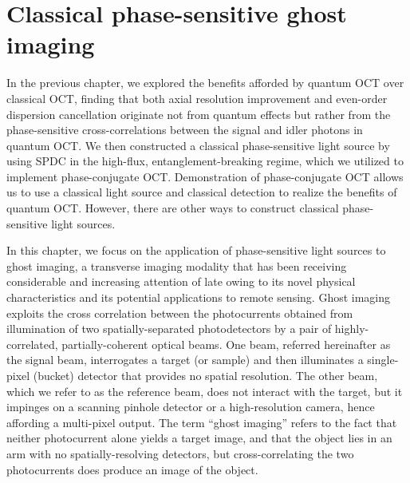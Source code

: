 \chapter{Classical phase-sensitive ghost imaging}
In the previous chapter, we explored the benefits afforded by quantum OCT over classical OCT, finding that both axial resolution improvement and even-order dispersion cancellation originate not from quantum effects but rather from the phase-sensitive cross-correlations between the signal and idler photons in quantum OCT. We then constructed a classical phase-sensitive light source by using SPDC in the high-flux, entanglement-breaking regime, which we utilized to implement phase-conjugate OCT. Demonstration of phase-conjugate OCT allows us to use a classical light source and classical detection to realize the benefits of quantum OCT. However, there are other ways to construct classical phase-sensitive light sources.

In this chapter, we focus on the application of phase-sensitive light sources to ghost imaging, a transverse imaging modality that has been receiving considerable and increasing attention of late owing to its novel physical characteristics and its potential applications to remote sensing. Ghost imaging exploits the cross correlation between the photocurrents obtained from illumination of two spatially-separated photodetectors by a pair of highly-correlated, partially-coherent optical beams. One beam, referred hereinafter as the signal beam, interrogates a target (or sample) and then illuminates a single-pixel (bucket) detector that provides no spatial resolution. The other beam, which we refer to as the reference beam, does not interact with the target, but it impinges on a scanning pinhole detector or a high-resolution camera, hence affording a multi-pixel output. The term ``ghost imaging'' refers to the fact that neither photocurrent alone yields a target image, and that the object lies in an arm with no spatially-resolving detectors, but cross-correlating the two photocurrents does produce an image of the object.  

